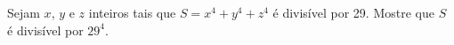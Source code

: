 Sejam \( x\), \( y\) e \( z\) inteiros tais que \( S = x^{4}+y^{4}+z^{4}\) é divisível por 29. Mostre que \( S\) é divisível por \( 29^{4}\).
